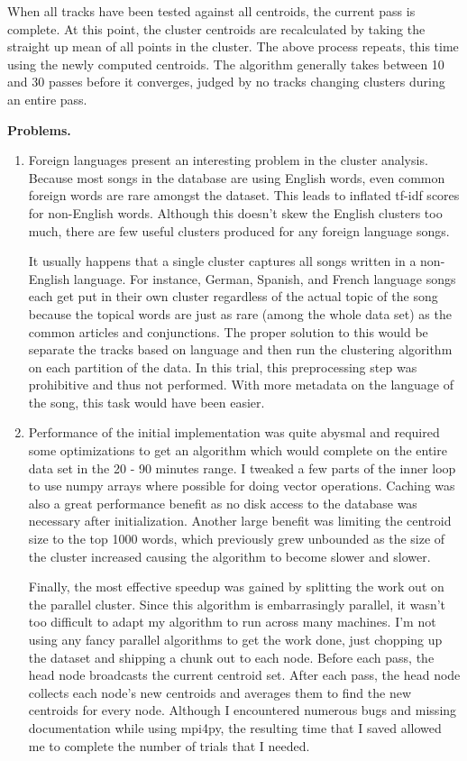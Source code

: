 \documentclass[11pt]{article}
\begin{document}
When all tracks have been tested against all centroids, the current pass is
complete.  At this point, the cluster centroids are recalculated by taking the
straight up mean of all points in the cluster. The above process repeats, this
time using the newly computed centroids. The algorithm generally takes between
10 and 30 passes before it converges, judged by no tracks changing clusters
during an entire pass.

\textbf{Problems.}

\begin{enumerate}
    \item Foreign languages present an interesting problem in the cluster analysis. 
    Because most songs in the database are using English words, even common foreign 
    words are rare amongst the dataset. This leads to inflated tf-idf scores for
    non-English words. Although this doesn't skew the English clusters too much, 
    there are few useful clusters produced for any foreign language songs. 

    It usually happens that a single cluster captures all songs written in a non-English
    language. For instance, German, Spanish, and French language songs each get put
    in their own cluster regardless of the actual topic of the song because the 
    topical words are just as rare (among the whole data set) as the common articles 
    and conjunctions. The proper solution to this would be separate the tracks based
    on language and then run the clustering algorithm on each partition of the 
    data. In this trial, this preprocessing step was prohibitive and thus not 
    performed. With more metadata on the language of the song, this task would
    have been easier.

    \item Performance of the initial implementation was quite abysmal and required
    some optimizations to get an algorithm which would complete on the entire data
    set in the 20 - 90 minutes range. I tweaked a few parts of the inner loop to
    use numpy arrays where possible for doing vector operations. Caching was also
    a great performance benefit as no disk access to the database was necessary
    after initialization. Another large benefit was limiting the centroid size to
    the top 1000 words, which previously grew unbounded as the size of the cluster increased
    causing the algorithm to become slower and slower.

    Finally, the most effective speedup was gained by splitting the work out on the
    parallel cluster. Since this algorithm is embarrasingly parallel, it wasn't 
    too difficult to adapt my algorithm to run across many machines. I'm not using
    any fancy parallel algorithms to get the work done, just chopping up the dataset
    and shipping a chunk out to each node. Before each pass, the head node broadcasts
    the current centroid set. After each pass, the head node collects each node's 
    new centroids and averages them to find the new centroids for every node. Although
    I encountered numerous bugs and missing documentation while using mpi4py, the
    resulting time that I saved allowed me to complete the number of trials that
    I needed.


\end{enumerate}
\end{document}
